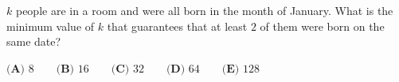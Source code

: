 $k$ people are in a room and were all born in the month of January. What is the minimum value of $k$ that guarantees that at least $2$ of them were born on the same date?

$\textbf{(A) }8\qquad\textbf{(B) }16\qquad\textbf{(C) }32\qquad\textbf{(D) }64\qquad\textbf{(E) }128$
